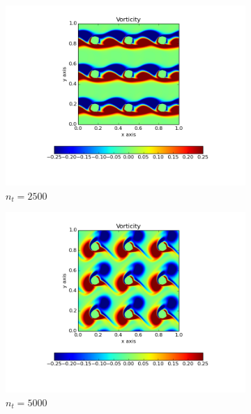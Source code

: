 \documentclass[10pt, a4paper]{article}
\begin{document}
\begin{figure}[!htb]
\centering
\begin{subfigure}{.5\textwidth}
  \centering
  \includegraphics[width=1.1\linewidth, clip=true, trim=1cm 2cm 1cm 1cm]{q3_0001}
  \caption{$n_t = 2500$}
\end{subfigure}%
\begin{subfigure}{.5\textwidth}
  \centering
  \includegraphics[width=1.1\linewidth, clip=true, trim=1cm 2cm 1cm 1cm]{q3_0002}
  \caption{$n_t = 5000$}
\end{subfigure}
\newline
\begin{subfigure}{.5\textwidth}
  \centering

\end{subfigure}
\end{figure}
\end{document}
